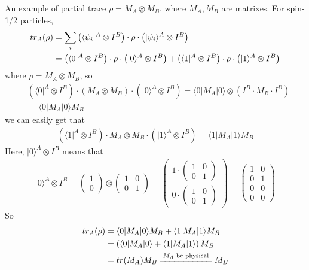 \documentclass[UTF8,12pt]{article} %
\numberwithin{equation}{section}
\begin{document}
\begin{myboxes}{An example of partial trace}{}
$\rho = M_{A} \otimes M_{B}$, where $M_{A}, M_{B}$ are matrixes. For spin-1/2 particles,
\begin{align}
tr_{A}(\rho) &= \sum_{i} \left(\langle\psi_{i}|^{A} \otimes I^{B}\right) \cdot \rho \cdot \left(|\psi_{i}\rangle^{A} \otimes I^{B}\right) \notag\\
&= \left(\langle0|^{A} \otimes I^{B}\right) \cdot \rho \cdot \left(|0\rangle^{A} \otimes I^{B}\right) + \left(\langle1|^{A} \otimes I^{B}\right) \cdot \rho \cdot \left(|1\rangle^{A} \otimes I^{B}\right)
\end{align}
where $\rho = M_{A} \otimes M_{B}$, so
\begin{align}
&\left(\langle0|^{A} \otimes I^{B}\right) \cdot \left(M_{A} \otimes M_{B}\right) \cdot \left(|0\rangle^{A} \otimes I^{B}\right) = \langle0|M_{A}|0\rangle \otimes \left(I^{B}\cdot M_{B} \cdot I^{B}\right)\\
&= \langle0|M_{A}|0\rangle M_{B}
\end{align}
we can easily get that
\begin{align}
\left(\langle1|^{A} \otimes I^{B}\right) \cdot M_{A} \otimes M_{B} \cdot \left(|1\rangle^{A} \otimes I^{B}\right) = \langle1|M_{A}|1\rangle M_{B}
\end{align}
Here, $|0\rangle^{A} \otimes I^{B}$ means that
\begin{align}
|0\rangle^{A} \otimes I^{B} = \begin{pmatrix}1\\0\end{pmatrix} \otimes \begin{pmatrix}1&0\\0&1\end{pmatrix} = \begin{pmatrix}1\cdot\begin{pmatrix}1&0\\0&1\end{pmatrix}\\0\cdot\begin{pmatrix}1&0\\0&1\end{pmatrix}\end{pmatrix} = \begin{pmatrix}1&0\\0&1\\0&0\\0&0\end{pmatrix}
\end{align}
So
\begin{align}
tr_{A}(\rho) &= \langle0|M_{A}|0\rangle M_{B} + \langle1|M_{A}|1\rangle M_{B} \\
&= \left(\langle0|M_{A}|0\rangle + \langle1|M_{A}|1\rangle\right) M_{B} \\
&= tr(M_{A}) M_{B} \xlongequal{M_{A}\text{ be physical}} M_{B}
\end{align}
\end{myboxes}
\end{document}
